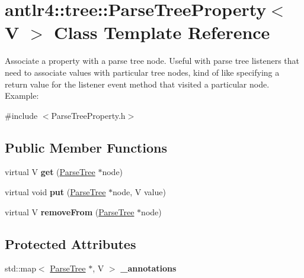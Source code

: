 \hypertarget{classantlr4_1_1tree_1_1ParseTreeProperty}{}\section{antlr4\+:\+:tree\+:\+:Parse\+Tree\+Property$<$ V $>$ Class Template Reference}
\label{classantlr4_1_1tree_1_1ParseTreeProperty}


Associate a property with a parse tree node. Useful with parse tree listeners that need to associate values with particular tree nodes, kind of like specifying a return value for the listener event method that visited a particular node. Example\+:  




{\ttfamily \#include $<$Parse\+Tree\+Property.\+h$>$}

\subsection*{Public Member Functions}
\begin{DoxyCompactItemize}
\item 
\mbox{\label{classantlr4_1_1tree_1_1ParseTreeProperty_acbf7b9e7fcfd83d4b8550b73246d94d0}} 
virtual V {\bfseries get} (\hyperlink{classantlr4_1_1tree_1_1ParseTree}{Parse\+Tree} $\ast$node)
\item 
\mbox{\label{classantlr4_1_1tree_1_1ParseTreeProperty_a481babdc60f9ade4743a13ae8c39abf2}} 
virtual void {\bfseries put} (\hyperlink{classantlr4_1_1tree_1_1ParseTree}{Parse\+Tree} $\ast$node, V value)
\item 
\mbox{\label{classantlr4_1_1tree_1_1ParseTreeProperty_a47cd1746c3c69ccd8758b8ab9c9d2702}} 
virtual V {\bfseries remove\+From} (\hyperlink{classantlr4_1_1tree_1_1ParseTree}{Parse\+Tree} $\ast$node)
\end{DoxyCompactItemize}
\subsection*{Protected Attributes}
\begin{DoxyCompactItemize}
\item 
\mbox{\label{classantlr4_1_1tree_1_1ParseTreeProperty_ad63ed1a0ec1b238fb632091ee3ad514a}} 
std\+::map$<$ \hyperlink{classantlr4_1_1tree_1_1ParseTree}{Parse\+Tree} $\ast$, V $>$ {\bfseries \+\_\+annotations}
\end{DoxyCompactItemize}


